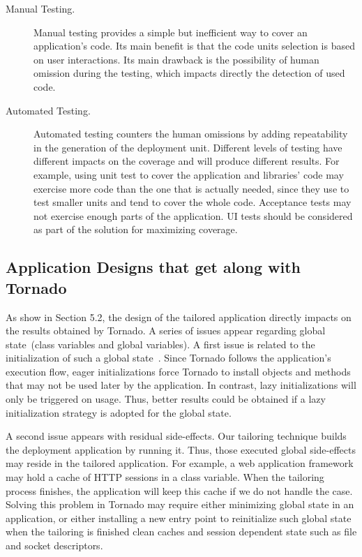 \begin{description}
\item[Manual Testing.] Manual testing provides a simple but inefficient way to cover an application's code. Its main benefit is that the code units selection is based on user interactions. Its main drawback is the possibility of human omission during the testing, which impacts directly the detection of used code. 
\item[Automated Testing.] Automated testing counters the human omissions by adding repeatability in the generation of the deployment unit. Different levels of testing have different impacts on the coverage and will produce different results. For example, using unit test to cover the application and libraries' code may exercise more code than the one that is actually needed, since they use to test smaller units and tend to cover the whole code. Acceptance tests may not exercise enough parts of the application. UI tests should be considered as part of the solution for maximizing coverage.
\end{description}


\subsection{Application Designs that get along with Tornado} As show in Section 5.2, the design of the tailored application directly impacts on the results obtained by Tornado. A series of issues appear regarding global state~(\eg class variables and global variables). A first issue is related to the initialization of such a global state~\cite{Unga95a}. Since Tornado follows the application's execution flow, eager initializations force Tornado to install objects and methods that may not be used later by the application. In contrast, lazy initializations will only be triggered on usage. Thus, better results could be obtained if a lazy initialization strategy is adopted for the global state.

A second issue appears with residual side-effects. Our tailoring technique builds the deployment application by running it. Thus, those executed global side-effects may reside in the tailored application. For example, a web application framework may hold a cache of HTTP sessions in a class variable. When the tailoring process finishes, the application will keep this cache if we do not handle the case. Solving this problem in Tornado may require either minimizing global state in an application, or either installing a new entry point to reinitialize such global state when the tailoring is finished \eg clean caches and session dependent state such as file and socket descriptors.

